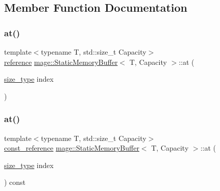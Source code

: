 \subsection{Member Function Documentation}
\mbox{\label{classmage_1_1_static_memory_buffer_a94a0114dc24b98034db44437eea73558}} 
\subsubsection{\texorpdfstring{at()}{at()}\hspace{0.1cm}{\footnotesize\ttfamily [1/2]}}
{\footnotesize\ttfamily template$<$typename T, std\+::size\+\_\+t Capacity$>$ \\
\mbox{\hyperlink{classmage_1_1_static_memory_buffer_ac00b0718b8b57bcaee2a7904637fc031}{reference}} \mbox{\hyperlink{classmage_1_1_static_memory_buffer}{mage\+::\+Static\+Memory\+Buffer}}$<$ T, Capacity $>$\+::at (\begin{DoxyParamCaption}\item[{\mbox{\hyperlink{classmage_1_1_static_memory_buffer_a13e19b7af61a49400c5be360f09aadc8}{size\+\_\+type}}}]{index }\end{DoxyParamCaption})}

\mbox{\label{classmage_1_1_static_memory_buffer_a64c3d250df05a1b205d813e86c123dcd}} 
\subsubsection{\texorpdfstring{at()}{at()}\hspace{0.1cm}{\footnotesize\ttfamily [2/2]}}
{\footnotesize\ttfamily template$<$typename T, std\+::size\+\_\+t Capacity$>$ \\
\mbox{\hyperlink{classmage_1_1_static_memory_buffer_a2d961d7baf56ebc96e1e48579bcdcb84}{const\+\_\+reference}} \mbox{\hyperlink{classmage_1_1_static_memory_buffer}{mage\+::\+Static\+Memory\+Buffer}}$<$ T, Capacity $>$\+::at (\begin{DoxyParamCaption}\item[{\mbox{\hyperlink{classmage_1_1_static_memory_buffer_a13e19b7af61a49400c5be360f09aadc8}{size\+\_\+type}}}]{index }\end{DoxyParamCaption}) const}


